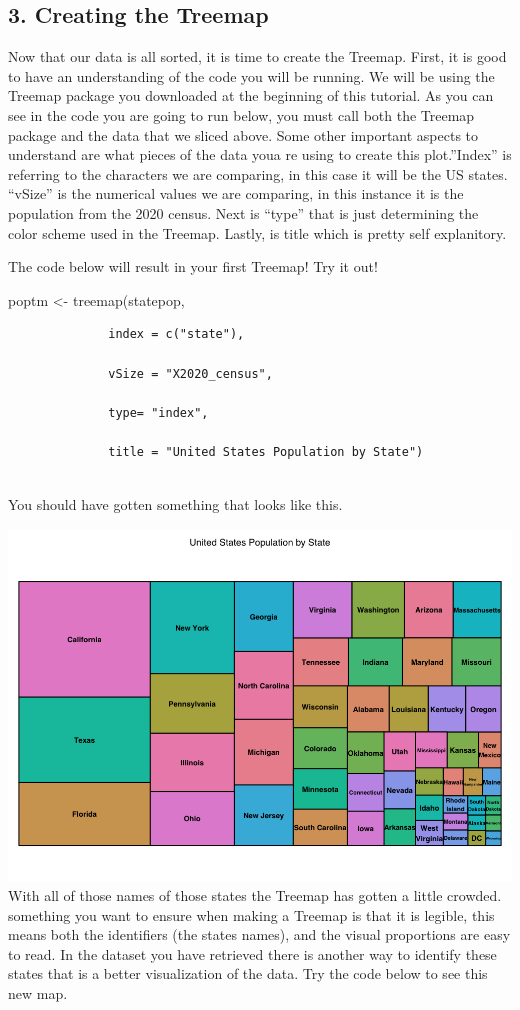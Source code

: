 \documentclass[
]{article}
\begin{document}
\hypertarget{creating-the-treemap-1}{%
\subsection{3. Creating the Treemap}\label{creating-the-treemap-1}}

Now that our data is all sorted, it is time to create the Treemap.
First, it is good to have an understanding of the code you will be
running. We will be using the Treemap package you downloaded at the
beginning of this tutorial. As you can see in the code you are going to
run below, you must call both the Treemap package and the data that we
sliced above. Some other important aspects to understand are what pieces
of the data youa re using to create this plot.''Index'' is referring to
the characters we are comparing, in this case it will be the US states.
``vSize'' is the numerical values we are comparing, in this instance it
is the population from the 2020 census. Next is ``type'' that is just
determining the color scheme used in the Treemap. Lastly, is title which
is pretty self explanitory.

The code below will result in your first Treemap! Try it out!

poptm \textless- treemap(statepop,

\begin{verbatim}
              index = c("state"),
              
              vSize = "X2020_census",
              
              type= "index",
              
              title = "United States Population by State")
              
\end{verbatim}

You should have gotten something that looks like this.

\includegraphics{plotfullname.png} With all of those names of those
states the Treemap has gotten a little crowded. something you want to
ensure when making a Treemap is that it is legible, this means both the
identifiers (the states names), and the visual proportions are easy to
read. In the dataset you have retrieved there is another way to identify
these states that is a better visualization of the data. Try the code
below to see this new map.
\end{document}
